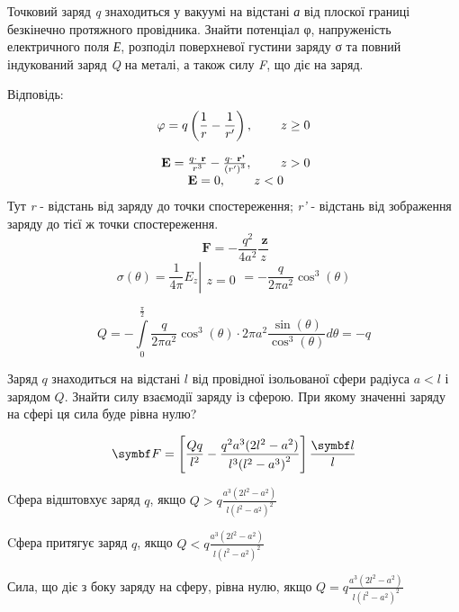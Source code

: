 \documentclass[]{ProblemBook}
\begin{document}
\begin{problem}
Точковий заряд \textit{q} знаходиться у вакуумі на відстані \textit{а} від плоскої границі безкінечно протяжного провідника. Знайти потенціал φ, напруженість електричного поля \textit{Е}, розподіл поверхневої густини заряду σ та повний індукований заряд \textit{Q} на металі, а також силу \textit{F}, що діє на заряд.    

	\begin{solution}
	Відповідь: 
\[\varphi  = q\left( {\frac{1}{r} - \frac{1}{{r'}}} \right),\;\;\;\;\;{\rm{}}\;\;\;z \ge 0\]

\[\begin{array}{*{20}{c}}
{\ \textbf{E} = \frac{{q \cdot \ \textbf{r}}}{{{r^3}}} - \frac{{q \cdot \  \textbf{r'}}}{{{{\left( {r'} \right)}^3}}},\;\;\;\;\;{\rm{}}\;\;\;z > 0}\\
{\ \textbf{E} = 0,\;\;\;\;\;{\rm{}}\;\;\;z < 0}
\end{array}\]
Тут \textit{r} - відстань від заряду до точки спостереження; \textit{r'} - відстань від зображення заряду до тієї ж точки спостереження.
\[\ \textbf{F} =  - \frac{{{q^2}}}{{4{a^2}}}\frac{{\ \textbf{z}}}{z}\]
\[\sigma \left( \theta  \right) = \left. {\frac{1}{{4\pi }}{E_z}} \right|\begin{array}{*{20}{c}}
{}\\
{z = 0}
\end{array} =  - \frac{q}{{2\pi {a^2}}}{\cos ^3}\left( \theta  \right)\]

\[Q =  - \int\limits_0^{\frac{\pi }{2}} {\frac{q}{{2\pi {a^2}}}} {\cos ^3}\left( \theta  \right) \cdot 2\pi {a^2}\frac{{\sin \left( \theta  \right)}}{{{{\cos }^3}\left( \theta  \right)}}d\theta  =  - q\]

\end{solution}
\end{problem}

\begin{problem}
    Заряд $q$ знаходиться на відстані $l$ від провідної ізольованої сфери радіуса $a < l$ і зарядом $Q$. Знайти силу взаємодії заряду із сферою. При якому значенні заряду на сфері ця сила буде рівна нулю?
	\begin{solution}
\[\vect{F} = \left[ \frac{Qq}{l^2} - \frac{q^2a^3( 2l^2 - a^2)}{l^3{( l^2 - a^3 )}^2} \right]\frac{\vect{l}}{l}\]

Cфера відштовхує заряд $q$, якщо $Q > q\frac{{{a^3}\left( {2{l^2} - {a^2}} \right)}}{{l{{\left( {{l^2} - {a^2}} \right)}^2}}}$

Cфера притягує заряд $q$, якщо $Q < q\frac{{{a^3}\left( {2{l^2} - {a^2}} \right)}}{{l{{\left( {{l^2} - {a^2}} \right)}^2}}}$

Сила, що діє з боку заряду на сферу, рівна нулю, якщо $Q = q\frac{{{a^3}\left( {2{l^2} - {a^2}} \right)}}{{l{{\left( {{l^2} - {a^2}} \right)}^2}}}$

\end{solution}
\end{problem}
\end{document}
